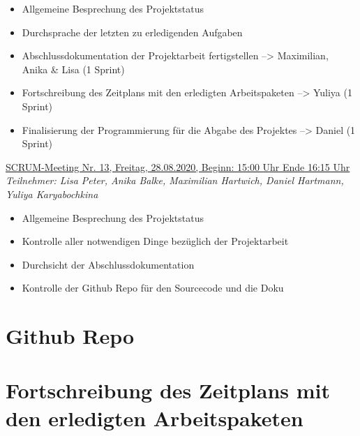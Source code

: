 \documentclass[a4paper,report,headsepline]{scrreprt}
\begin{document}
\begin{itemize}
\item Allgemeine Besprechung des Projektstatus 
\item Durchsprache der letzten zu erledigenden Aufgaben 
\item Abschlussdokumentation der Projektarbeit fertigstellen --> Maximilian, Anika \& Lisa (1 Sprint) 
\item Fortschreibung des Zeitplans mit den erledigten Arbeitspaketen --> Yuliya (1 Sprint) 
\item Finalisierung der Programmierung für die Abgabe des Projektes --> Daniel (1 Sprint) 
\end{itemize}
\underline{{\large SCRUM-Meeting Nr. 13, Freitag, 28.08.2020, Beginn: 15:00 Uhr Ende 16:15 Uhr}} \\
\textit{Teilnehmer: Lisa Peter, Anika Balke, Maximilian Hartwich, Daniel Hartmann, Yuliya Karyabochkina}

\begin{itemize}
\item Allgemeine Besprechung des Projektstatus 
\item Kontrolle aller notwendigen Dinge bezüglich der Projektarbeit 
\item Durchsicht der Abschlussdokumentation 
\item Kontrolle der Github Repo für den Sourcecode und die Doku 
\end{itemize}
     
\chapter{Github Repo}
\chapter{Fortschreibung des Zeitplans mit den erledigten Arbeitspaketen}
\end{document}
